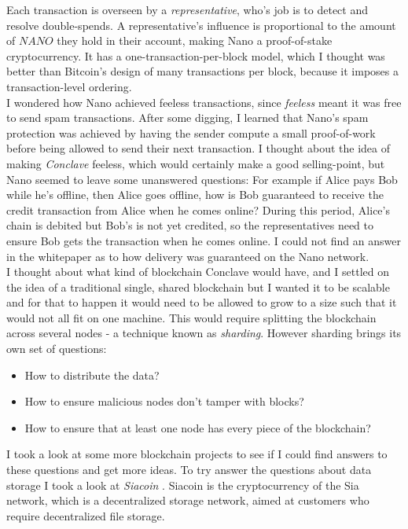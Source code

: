\documentclass{report}
\begin{document}
	Each transaction is overseen by a \textit{representative}, who's job is to detect and resolve double-spends.  A representative's influence is proportional to the amount of $NANO$ they hold in their account, making Nano a proof-of-stake  cryptocurrency. It has a one-transaction-per-block model, which I thought was better than Bitcoin's design of many transactions per block, because it imposes a transaction-level ordering. \\
	
	I wondered how Nano  achieved feeless transactions, since \textit{feeless} meant it was free to send spam transactions. After some digging, I learned that Nano's spam protection was achieved by having the sender compute a small proof-of-work before being allowed to send their next transaction. I thought about the idea of making \textit{Conclave} feeless, which would certainly make a good selling-point, but Nano seemed to leave some unanswered questions: For example if Alice pays Bob while he's offline, then Alice goes offline, how is Bob guaranteed to receive the credit transaction from Alice when he comes online? During this period, Alice's chain is debited but Bob's is not yet credited, so the representatives need to ensure Bob gets the transaction when he comes online. I could not find an answer in the whitepaper as to how delivery was guaranteed on the Nano network. \\
	
	I thought about what kind of blockchain Conclave would have, and I settled on the idea of a traditional single, shared blockchain but I wanted it to be scalable and for that to happen it would need to be allowed to grow to a size such that it would not all fit on one machine. This would require splitting the blockchain across several nodes - a technique known as \textit{sharding}. However sharding brings its own set of questions:
	\begin{itemize}
		\item How to distribute the data?
		\item How to ensure malicious nodes don't tamper with blocks?
		\item How to ensure that at least one node has every piece of the blockchain?
	\end{itemize}
	
	I took a look at some more blockchain projects to see if I could find answers to these questions and get more ideas. To try answer the questions about data storage I took a look at \textit{Siacoin} \cite{sia}. Siacoin  is the cryptocurrency of the Sia network, which is a decentralized storage network, aimed at customers who require decentralized file storage. \\
	
\end{document}
